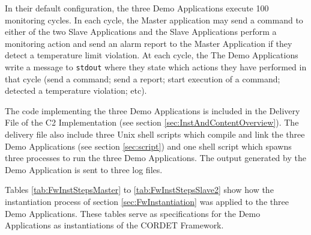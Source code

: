 \documentclass[a4paper,10pt]{article}
\begin{document}
In their default configuration, the three Demo Applications execute 100 monitoring cycles. In each cycle, the Master application may send a command to either of the two Slave Applications and the Slave Applications perform a monitoring action and send an alarm report to the Master Application if they detect a temperature limit violation. At each cycle, the The Demo Applications write a message to \texttt{stdout} where they state which actions they have performed in that cycle (send a command; send a report; start execution of a command; detected a temperature violation; etc).

The code implementing the three Demo Applications is included in the Delivery File of the C2 Implementation (see section \ref{sec:InstAndContentOverview}). The delivery file also include three Unix shell scripts which compile and link the three Demo Applications (see section \ref{sec:script}) and one shell script which spawns three processes to run the three Demo Applications. The output generated by the Demo Application is sent to three log files.

Tables \ref{tab:FwInstStepsMaster} to \ref{tab:FwInstStepsSlave2} show how the instantiation process of section \ref{sec:FwInstantiation} was applied to the three Demo Applications. These tables serve as specifications for the Demo Applications as instantiations of the CORDET Framework.
\end{document}
